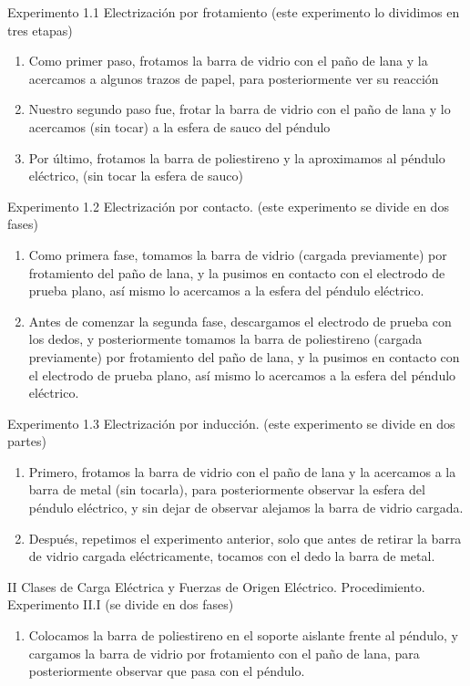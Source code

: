 \documentclass[14pt]{article}
\begin{document}
\begin{multicols}{2}
	Experimento 1.1 Electrización por frotamiento 
	(este experimento lo dividimos en tres etapas) 
	\begin{enumerate}
		\item Como primer paso, frotamos la barra de vidrio con el paño de lana y la acercamos a algunos trazos de papel, para posteriormente ver su reacción 
		\item Nuestro segundo paso fue, frotar la barra de vidrio con el paño de lana y lo acercamos (sin tocar) a la esfera de sauco del péndulo 
		\item Por último, frotamos la barra de poliestireno y la aproximamos al péndulo eléctrico, (sin tocar la esfera de sauco)
	\end{enumerate}
	Experimento 1.2 Electrización por contacto. 
(este experimento se divide en dos fases) 
\begin{enumerate}
	\item Como primera fase, tomamos la barra de vidrio (cargada previamente) por frotamiento del paño de lana, y la pusimos en contacto con el electrodo de prueba plano, así mismo lo acercamos a la esfera del péndulo eléctrico. 
	\item Antes de comenzar la segunda fase, descargamos el electrodo de prueba con los dedos, y posteriormente tomamos la barra de poliestireno (cargada previamente) por frotamiento del paño de lana, y la pusimos en contacto con el electrodo de prueba plano, así mismo lo acercamos a la esfera del péndulo eléctrico.  
\end{enumerate}
Experimento 1.3 Electrización por inducción. 
(este experimento se divide en dos partes) 
\begin{enumerate}
	\item Primero, frotamos la barra de vidrio con el paño de lana y la acercamos a la barra de metal (sin tocarla), para posteriormente observar la esfera del péndulo eléctrico, y sin dejar de observar alejamos la barra de vidrio cargada.
	\item Después, repetimos el experimento anterior, solo que antes de retirar la barra de vidrio cargada eléctricamente, tocamos con el dedo la barra de metal. 
\end{enumerate}
II Clases de Carga Eléctrica y Fuerzas de Origen Eléctrico.
Procedimiento. Experimento II.I
(se divide en dos fases)
\begin{enumerate}
	\item Colocamos la barra de poliestireno en el soporte aislante frente al péndulo, y cargamos la barra de vidrio por frotamiento con el paño de lana, para posteriormente observar que pasa con el péndulo. 

\end{enumerate}
\end{multicols}
\end{document}
